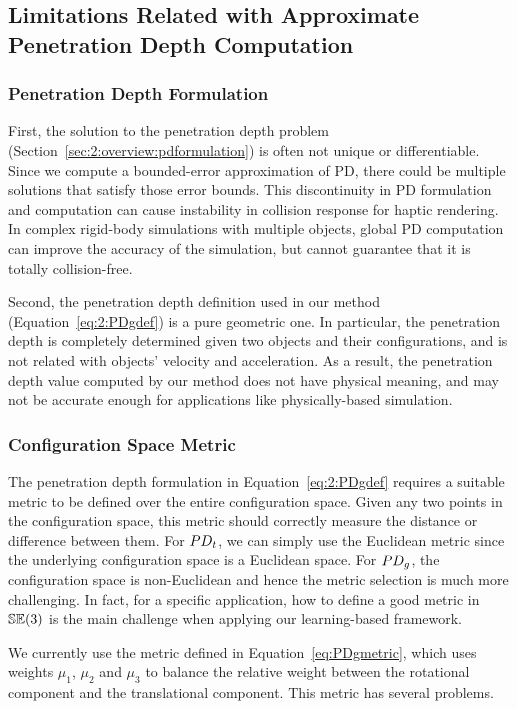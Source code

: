 \subsection{Limitations Related with Approximate Penetration Depth Computation}

\subsubsection{Penetration Depth Formulation}

First, the solution to the penetration depth problem (Section~\ref{sec:2:overview:pdformulation}) is often not unique or differentiable. Since we compute a bounded-error approximation of PD, there could be multiple solutions that satisfy those error bounds. This discontinuity in PD formulation and computation can cause instability in collision response for haptic rendering. In complex rigid-body simulations with multiple objects, global PD computation can improve the accuracy of the simulation, but cannot guarantee that it is totally collision-free.

Second, the penetration depth definition used in our method (Equation~\ref{eq:2:PDgdef}) is a pure geometric one. In particular, the penetration depth is completely determined given two objects and their configurations, and is not related with objects' velocity and acceleration. As a result, the penetration depth value computed by our method does not have physical meaning, and may not be accurate enough for applications like physically-based simulation.



\subsubsection{Configuration Space Metric}
The penetration depth formulation in Equation~\ref{eq:2:PDgdef} requires a suitable metric to be defined over the entire configuration space. Given any two points in the configuration space, this metric should correctly measure the distance or difference between them.  
For $PD_t$, we can simply use the Euclidean metric since the underlying configuration space is a Euclidean space. 
For $PD_g$, the configuration space is non-Euclidean and hence the metric selection is much more challenging. In fact, for a specific application, how to define a good metric in $\mathbb {SE}(3)$ is the main challenge when applying our learning-based framework. 


We currently use the metric defined in Equation~\ref{eq:PDgmetric}, which uses weights $\mu_1$, $\mu_2$ and $\mu_3$ to balance the relative weight between the rotational component and the translational component. This metric has several problems. 

